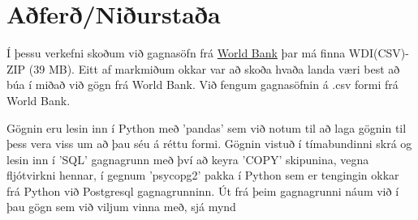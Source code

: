 \documentclass[11pt,a4paper]{amsart}
\theoremstyle{plain}
\theoremstyle{definition}
\theoremstyle{remark}
\begin{document}


\section{Aðferð/Niðurstaða}
Í þessu verkefni skoðum við gagnasöfn frá \href{http://data.worldbank.org/data-catalog/world-development-indicators}{World Bank} þar má finna WDI(CSV)-ZIP (39 MB). Eitt af markmiðum okkar var að skoða hvaða landa væri best að búa í miðað við gögn frá World Bank. Við fengum gagnasöfnin á .csv formi frá World Bank.\par Gögnin eru lesin inn í Python með 'pandas' sem við notum til að laga gögnin til þess vera viss um að þau séu á réttu formi. Gögnin vistuð í tímabundinni skrá og lesin inn í 'SQL' gagnagrunn með því að keyra 'COPY' skipunina, vegna fljótvirkni hennar, í gegnum 'psycopg2' pakka í Python sem er tengingin okkar frá Python við Postgresql gagnagrunninn. Út frá þeim gagnagrunni náum við í þau gögn sem við viljum vinna með, sjá mynd %
\end{document}
